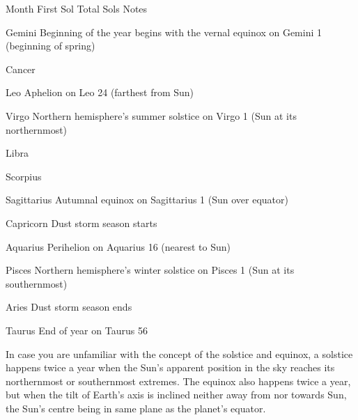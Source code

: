 {
    \bTABLE[split=repeat,option=stretch]
    \setupTABLE[column][4]
        [width=.60\textwidth,
        align=yes]
    \setupTABLE[row][each][align=center]
    \setupTABLE[4][1][align=center]

\bTABLEhead
    \bTR[bottomframe=on]
      \bTH  Month \eTH
      \bTH  First Sol \eTH
      \bTH  Total Sols \eTH
      \bTH  Notes \eTH
    \eTR
\eTABLEhead

\bTABLEbody
    \bTR
      \bTC Gemini \eTC
       \eTC
       \eTC
      \bTC Beginning of the year begins with the vernal equinox on Gemini 1 (beginning of spring)\eTC
    \eTR
    
    \bTR
      \bTC Cancer \eTC
       \eTC
       \eTC
      \bTC  \eTC
    \eTR
    
    \bTR
      \bTC Leo \eTC
       \eTC
       \eTC
      \bTC Aphelion on Leo 24 (farthest from Sun)\eTC
    \eTR
    
    \bTR
      \bTC Virgo \eTC
       \eTC
       \eTC
      \bTC Northern hemisphere's summer solstice on Virgo 1 (Sun at its northernmost)\eTC
    \eTR
    
    \bTR
      \bTC Libra \eTC
       \eTC
       \eTC
      \bTC  \eTC
    \eTR
    
    \bTR
      \bTC Scorpius \eTC
       \eTC
       \eTC
      \bTC  \eTC
    \eTR
    
    \bTR
      \bTC Sagittarius \eTC
       \eTC
       \eTC
      \bTC Autumnal equinox on Sagittarius 1 (Sun over equator)\eTC
    \eTR
    
    \bTR
      \bTC Capricorn \eTC
       \eTC
       \eTC
      \bTC Dust storm season starts \eTC
    \eTR
    
    \bTR
      \bTC Aquarius \eTC
       \eTC
       \eTC
      \bTC Perihelion on Aquarius 16 (nearest to Sun)\eTC
    \eTR
    
    \bTR
      \bTC Pisces \eTC
       \eTC
       \eTC
      \bTC Northern hemisphere's winter solstice on Pisces 1 (Sun at its southernmost) \eTC
    \eTR
    
    \bTR
      \bTC Aries \eTC
       \eTC
       \eTC
      \bTC Dust storm season ends \eTC
    \eTR 

    \bTR
      \bTC Taurus \eTC
       \eTC
       \eTC
      \bTC End of year on Taurus 56 \eTC
    \eTR 
\eTABLEbody

\eTABLE
}

In case you are unfamiliar with the concept of the solstice and equinox, a solstice happens twice a year when the Sun's apparent position in the sky reaches its northernmost or southernmost extremes. The equinox also happens twice a year, but when the tilt of Earth's axis is inclined neither away from nor towards Sun, the Sun's centre being in same plane as the planet's equator.

